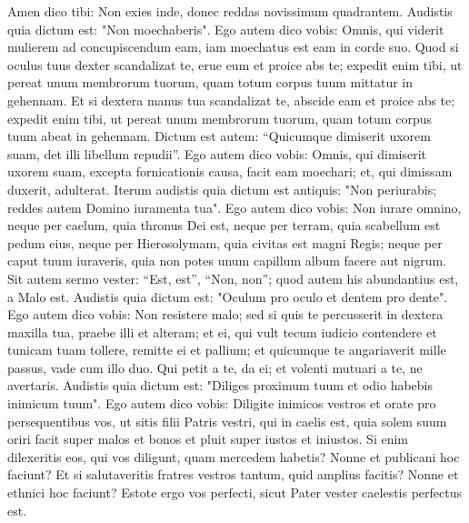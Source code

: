 \begin{biblechapter}
\begin{biblechapter}
\begin{biblechapter}
\begin{biblechapter}
\begin{biblechapter}
\verse Amen dico tibi: Non exies inde, donec reddas novissimum quadrantem.
 \verse Audistis quia dictum est: "Non moechaberis". 
\verse Ego autem dico vobis: Omnis, qui viderit mulierem ad concupiscendum eam, iam moechatus est eam in corde suo. 
\verse Quod si oculus tuus dexter scandalizat te, erue eum et proice abs te; expedit enim tibi, ut pereat unum membrorum tuorum, quam totum corpus tuum mittatur in gehennam. 
\verse Et si dextera manus tua scandalizat te, abscide eam et proice abs te; expedit enim tibi, ut pereat unum membrorum tuorum, quam totum corpus tuum abeat in gehennam.
 \verse Dictum est autem: “Quicumque dimiserit uxorem suam, det illi libellum repudii”. 
\verse Ego autem dico vobis: Omnis, qui dimiserit uxorem suam, excepta fornicationis causa, facit eam moechari; et, qui dimissam duxerit, adulterat.
 \verse Iterum audistis quia dictum est antiquis: "Non periurabis; reddes autem Domino iuramenta tua". 
\verse Ego autem dico vobis: Non iurare omnino, neque per caelum, quia thronus Dei est, 
\verse neque per terram, quia scabellum est pedum eius, neque per Hierosolymam, quia civitas est magni Regis; 
\verse neque per caput tuum iuraveris, quia non potes unum capillum album facere aut nigrum. 
 \verse Sit autem sermo vester: “Est, est”, “Non, non”; quod autem his abundantius est, a Malo est.
 \verse Audistis quia dictum est: "Oculum pro oculo et dentem pro dente". 
\verse Ego autem dico vobis: Non resistere malo; sed si quis te percusserit in dextera maxilla tua, praebe illi et alteram; 
\verse et ei, qui vult tecum iudicio contendere et tunicam tuam tollere, remitte ei et pallium; 
\verse et quicumque te angariaverit mille passus, vade cum illo duo. 
\verse Qui petit a te, da ei; et volenti mutuari a te, ne avertaris.
 \verse Audistis quia dictum est: "Diliges proximum tuum et odio habebis inimicum tuum". 
\verse Ego autem dico vobis: Diligite inimicos vestros et orate pro persequentibus vos, 
\verse ut sitis filii Patris vestri, qui in caelis est, quia solem suum oriri facit super malos et bonos et pluit super iustos et iniustos. 
\verse Si enim dilexeritis eos, qui vos diligunt, quam mercedem habetis? Nonne et publicani hoc faciunt? 
\verse Et si salutaveritis fratres vestros tantum, quid amplius facitis? Nonne et ethnici hoc faciunt? 
\verse Estote ergo vos perfecti, sicut Pater vester caelestis perfectus est.
 

\end{biblechapter}
\end{biblechapter}
\end{biblechapter}
\end{biblechapter}
\end{biblechapter}
